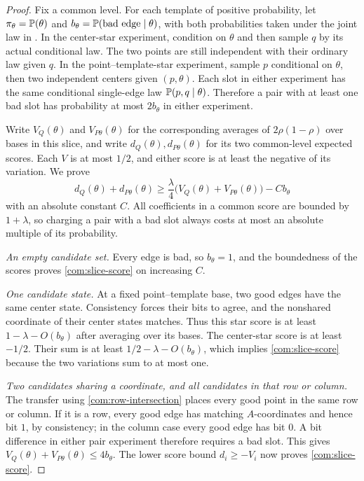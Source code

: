 \begin{proof}
Fix a common level. For each template of positive probability, let
\(\pi_\theta=\mathbb P(\theta)\) and
\(b_\theta=\mathbb P(\text{bad edge}\mid\theta)\), with both probabilities taken
under the joint law in . In the center-star experiment,
condition on \(\theta\) and then sample \(q\) by its actual conditional law.
The two points are still independent with their ordinary law given \(q\).
In the point--template-star experiment, sample \(p\) conditional on
\(\theta\), then two independent centers given \((p,\theta)\). Each slot
in either experiment has the same conditional single-edge law
\(\mathbb P(p,q\mid\theta)\). Therefore a pair with at least one bad slot has
probability at most \(2b_\theta\) in either experiment.

Write \(V_Q(\theta)\) and \(V_{P\theta}(\theta)\) for the corresponding
averages of \(2\rho(1-\rho)\) over bases in this slice, and write
\(d_Q(\theta),d_{P\theta}(\theta)\) for its two common-level expected
scores. Each \(V\) is at most \(1/2\), and either score is at least the
negative of its variation. We prove
\begin{equation}\label{com:slice-score}
 d_Q(\theta)+d_{P\theta}(\theta)
 \ge\frac\lambda4\bigl(V_Q(\theta)+V_{P\theta}(\theta)\bigr)
       -C b_\theta
\end{equation}
with an absolute constant \(C\). All coefficients in a common score are
bounded by \(1+\lambda\), so charging a pair with a bad slot always costs
at most an absolute multiple of its probability.

\emph{An empty candidate set.}
Every edge is bad, so \(b_\theta=1\), and the boundedness of the scores proves
\eqref{com:slice-score} on increasing \(C\).

\emph{One candidate state.}
At a fixed point--template base, two good edges have the same center state.
Consistency forces their bits to agree, and the nonshared coordinate of
their center states matches. Thus this star score is at least
\(1-\lambda-O(b_\theta)\) after averaging over its bases. The center-star
score is at least \(-1/2\). Their sum is at least
\(1/2-\lambda-O(b_\theta)\), which implies \eqref{com:slice-score} because
the two variations sum to at most one.

\emph{Two candidates sharing a coordinate, and all candidates in that row
or column.}
The transfer using \eqref{com:row-intersection} places every good point in
the same row or column. If it is a row, every good edge has matching
\(A\)-coordinates and hence bit \(1\), by consistency; in the column case
every good edge has bit \(0\). A bit difference in either pair experiment
therefore requires a bad slot. This gives
\(V_Q(\theta)+V_{P\theta}(\theta)\le4b_\theta\). The lower score bound
\(d_i\ge-V_i\) now proves \eqref{com:slice-score}.


\end{proof}
